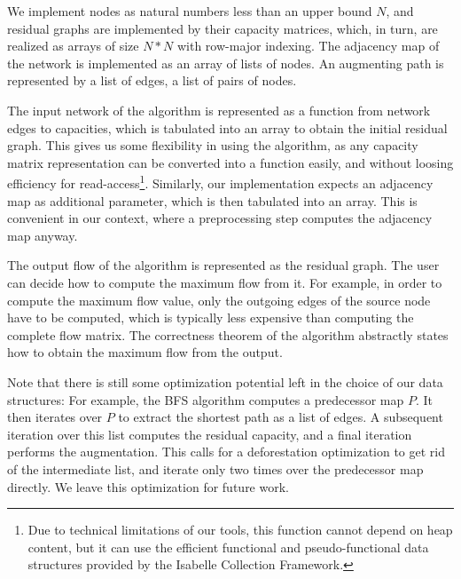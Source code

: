 \documentclass{llncs}
\newcommand{\isai}{\lstinline[language=isabelle,basicstyle=\normalsize\ttfamily\slshape]}
\begin{document}
  We implement nodes as natural numbers less than an upper bound $N$, and residual graphs are implemented by their capacity matrices, which, in turn,
  are realized as arrays of size $N*N$ with row-major indexing.
  The adjacency map of the network is implemented as an array of lists of nodes. 
  An augmenting path is represented by a list of edges, \ie a list of pairs of nodes. 
  
  
  
  The input network of the algorithm is represented as a function from network edges to capacities, which is tabulated into an array
  to obtain the initial residual graph. This gives us some flexibility in using the algorithm, as any capacity matrix representation can be converted into a 
  function easily, and without loosing efficiency for read-access\footnote{Due to technical limitations of our tools, this function 
  cannot depend on heap content, but it can use the efficient functional and pseudo-functional data structures provided by the Isabelle Collection Framework.}. 
  Similarly, our implementation expects an adjacency map as additional parameter, which is then tabulated into an array. This is convenient in our context, where a preprocessing step computes the adjacency map anyway.
      
  The output flow of the algorithm is represented as the residual graph. The user can decide how to compute the maximum flow from it. For example,
  in order to compute the maximum flow value, only the outgoing edges of the source node have to be computed, which is typically less 
  expensive than computing the complete flow matrix. The correctness theorem of the algorithm abstractly states how to obtain the maximum flow from the output.

  Note that there is still some optimization potential left in the choice of our data structures: 
  For example, the BFS algorithm computes a predecessor map $P$. It then iterates over $P$ to extract the shortest path as a list of edges.
  A subsequent iteration over this list computes the residual capacity, and a final iteration performs the augmentation. 
  This calls for a deforestation optimization to get rid of the intermediate list, and iterate only two times over the predecessor map directly.
  We leave this optimization for future work.
\end{document}
